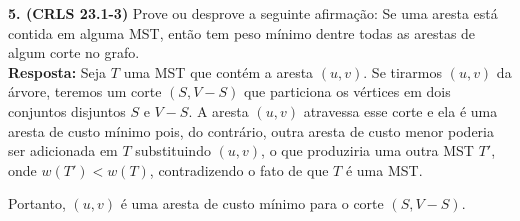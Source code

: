 
\noindent\textbf{5. (CRLS 23.1-3)} Prove ou desprove a seguinte afirmação: Se uma aresta está contida em alguma MST, então tem peso mínimo dentre todas as arestas de algum corte no grafo.\\[6pt]
\textbf{Resposta:} Seja $T$ uma MST que contém a aresta $(u, v)$. Se tirarmos $(u, v)$ da árvore, teremos um corte $(S, V - S)$ que particiona os vértices em dois conjuntos disjuntos $S$ e $V - S$. A aresta $(u, v)$ atravessa esse corte e ela é uma aresta de custo mínimo pois, do contrário, outra aresta de custo menor poderia ser adicionada em $T$ substituindo $(u, v)$, o que produziria uma outra MST $T'$, onde $w(T') < w(T)$, contradizendo o fato de que $T$ é uma MST.

Portanto, $(u, v)$ é uma aresta de custo mínimo para o corte $(S, V - S)$.\\[6pt]